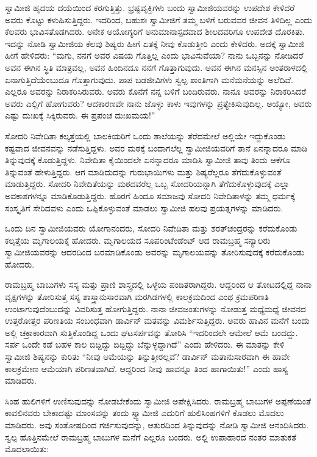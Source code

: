  ಸ್ವಾಮೀಜಿ ಹೃದಯ ದಯೆಯಿಂದ ಕರಗುತ್ತಿತ್ತು. ಭ್ರಷ್ಟವೃಕ್ತಿಗಳು ಬಂದು ಸ್ವಾಮೀಜಿಯವರನ್ನು ಉಪದೇಶ ಕೇಳಿದರೆ ಅವರು ಕೊಟ್ಟು ಕಳುಹಿಸುತ್ತಿದ್ದರು. ಇದರಿಂದ, ಬಹುಶಃ ಸ್ವಾಮೀಜಿಗೆ ತಮ್ಮ ಬಳಿಗೆ ಬರುವವರ ಜೀವನ ತಿಳಿದಿಲ್ಲ ಎಂದು ಕೆಲವರು ಭಾವಿಸತೊಡಗಿದರು. ಅನೇಕ ಅಯೋಗ್ಯರಿಗೆ ಅನುಮಾನಾಸ್ಪದವಾದ ಶೀಲದವರಿಗೂ ಉಪದೇಶ ದೊರಕಿತು. ಇದನ್ನು ನೋಡಿ ಸ್ವಾಮೀಜಿಯ ಕೆಲವು ಶಿಷ್ಯರು ಹೀಗೆ ಏತಕ್ಕೆ ನೀವು ಕೊಡುತ್ತೀರಿ ಎಂದು ಕೇಳಿದರು. ಅದಕ್ಕೆ ಸ್ವಾಮೀಜಿ ಹೀಗೆ ಹೇಳಿದರು: “ಮಗು, ನನಗೆ ಅವರ ವಿಷಯ ಗೊತ್ತಿಲ್ಲ ಎಂದು ಭಾವಿಸುವೆಯಾ? ನಾನು ಒಬ್ಬನನ್ನು ನೋಡಿದರೆ ಅವನ ಈಗಿನ ಸ್ಥಿತಿ ಮಾತ್ರವಲ್ಲ, ಅವನ ಹಿಂದಿನದೂ ನನಗೆ ಗೊತ್ತಾಗುವುದು. ಅವನ ಈಗಿನ ಮನಸ್ಸಿನ ಅಂತರಾಳದಲ್ಲಿ ಏನಾಗುತ್ತಿದೆಯೆಂಬುದೂ ಗೊತ್ತಾಗುವುದು. ಪಾಪ ಬಡಜೀವಿಗಳು ಸ್ವಲ್ಪ ಶಾಂತಿಗಾಗಿ ಮನೆಮನೆಯನ್ನು ಅಲೆದಿವೆ. ಎಲ್ಲರೂ ಅವರನ್ನು ನಿರಾಕರಿಸಿರುವರು. ಅವರು ಕೊನೆಗೆ ನನ್ನ ಬಳಿಗೆ ಬಂದಿರುವರು. ನಾನೂ ಅವರನ್ನು ನಿರಾಕರಿಸಿದರೆ ಅವರು ಎಲ್ಲಿಗೆ ಹೋಗುವರು? ಆದಕಾರಣವೇ ನಾನು ಜೊಳ್ಳು ಕಾಳು ಇವುಗಳನ್ನು ಪ್ರತ್ಯೇಕಿಸುವುದಿಲ್ಲ. ಅಯ್ಯೋ, ಅವರು ಎಷ್ಟು ದುಃಖಕ್ಕೆ ಸಿಕ್ಕಿರುವರು. ಈ ಪ್ರಪಂಚ ದುಃಖಮಯ!” 

 ಸೋದರಿ ನಿವೇದಿತಾ ಕಲ್ಕತ್ತೆಯಲ್ಲಿ ಬಾಲಕಿಯರಿಗೆ ಒಂದು ಶಾಲೆಯನ್ನು ತೆರೆದಮೇಲೆ ಅಲ್ಲಿಯೇ ಇದ್ದುಕೊಂಡು ಕಷ್ಟವಾದ ಜೀವನವನ್ನು ನಡೆಸುತ್ತಿದ್ದಳು. ಅವರ ಮಠಕ್ಕೆ ಬಂದಾಗಲೆಲ್ಲ ಸ್ವಾಮೀಜಿಯವರಿಗೆ ತಾನೆ ಏನನ್ನಾದರೂ ಮಾಡಿ ತಿನ್ನುವುದಕ್ಕೆ ಕೊಡುತ್ತಿದ್ದಳು. ನಿವೇದಿತಾ ಕೈಯಿಂದಲೇ ಏನನ್ನಾದರೂ ಮಾಡಿಸಿ ಸ್ವಾಮೀಜಿ ತಾವು ತಿಂದು ಆಕೆಗೂ ತಿನ್ನುವಂತೆ ಹೇಳುತ್ತಿದ್ದರು. ಆಗ ಮಾಡಿದುದನ್ನು ಗುರುಭಾಯಿಗಳು ಮತ್ತು ಶಿಷ್ಯರೆಲ್ಲರೂ ತೆಗೆದುಕೊಳ್ಳುವಂತೆ ಮಾಡುತ್ತಿದ್ದರು. ಸೋದರಿ ನಿವೇದಿತೆಯನ್ನು ಮಠದವರೆಲ್ಲ ಒಬ್ಬ ಸೋದರಿಯನ್ನಾಗಿ ತೆಗೆದುಕೊಳ್ಳುವುದಕ್ಕೆ ಎಲ್ಲಾ ಅವಕಾಶಗಳನ್ನೂ ಮಾಡಿಕೊಡುತ್ತಿದ್ದರು. ಹೊರಗೆ ಹಿಂದೂ‌ ಸಮಾಜವು ಸೋದರಿ ನಿವೇದಿತಾಳನ್ನು ತಮ್ಮ ಧರ್ಮಕ್ಕೆ ಸಂಸ್ಕೃತಿಗೆ ಸೇರಿದವಳು ಎಂದು ಒಪ್ಪಿಕೊಳ್ಳುವಂತೆ ಮಾಡಲು ಸ್ವಾಮೀಜಿ ಹಲವು ಪ್ರಯತ್ನಗಳನ್ನು ಮಾಡಿದರು. 

 ಒಂದು ದಿನ ಸ್ವಾಮೀಜಿಯವರು ಯೋಗಾನಂದರು, ಸೋದರಿ ನಿವೇದಿತಾ ಮತ್ತು ಶರತ್‍ಚಂದ್ರರನ್ನು ಕರೆದುಕೊಂಡು ಕಲ್ಕತ್ತೆಯ ಮೃಗಾಲಯಕ್ಕೆ ಹೋದರು. ಮೃಗಾಲಯದ ಸೂಪರಿಂಟೆಂಡೆಂಟ್ ಆದ ರಾಮಬ್ರಹ್ಮ ಸನ್ಯಾಲರು ಸ್ವಾಮೀಜಿಯವರನ್ನು ಆದರದಿಂದ ಬರಮಾಡಿಕೊಂಡು ಅವರನ್ನು ಮೃಗಾಲಯವನ್ನು ತೋರಿಸುವುದಕ್ಕೆ ಕರೆದುಕೊಂಡು ಹೋದರು. 

 ರಾಮಬ್ರಹ್ಮ ಬಾಬುಗಳು ಸಸ್ಯ ಮತ್ತು ಪ್ರಾಣಿ ಶಾಸ್ತ್ರದಲ್ಲಿ ಒಳ್ಳೆಯ ಪಂಡಿತರಾಗಿದ್ದರು. ಆದ್ದರಿಂದ ಆ ತೋಟದಲ್ಲಿದ್ದ ನಾನಾ ವೃಕ್ಷಗಳನ್ನು ತೋರಿಸುತ್ತ ಸಸ್ಯ ಶಾಸ್ತ್ರಾನುಸಾರವಾಗಿ ಮರಗಿಡಗಳಲ್ಲಿ ಕಾಲಕ್ರಮದಿಂದ ಎಂಥ ಕ್ರಮಪರಿಣತಿ ಉಂಟಾಗುವುದೆಂಬುದನ್ನು ವಿವರಿಸುತ್ತ ಹೋಗುತ್ತಿದ್ದರು. ನಾನಾ ಜೀವಜಂತುಗಳನ್ನು ನೋಡುತ್ತ ಮಧ್ಯೆಮಧ್ಯೆ ಜೀವನದ ಉತ್ತರೋತ್ತರ ಪರಿಣತಿಯ ಸಂಬಂಧವಾಗಿ ಡಾರ್ವಿನ್ ಮತವನ್ನು ವಿಮರ್ಶಿಸುತ್ತಿದ್ದರು. ಅವರು ಹಾವಿನ ಮನೆಗೆ ಬಂದು ಅಲ್ಲಿ ಚಕ್ರಾಕಾರವಾಗಿ ಸುತ್ತಿಕೊಂಡಿದ್ದ ಒಂದು ಘಟಸರ್ಪವನ್ನು ತೋರಿಸಿ “ಇದರಿಂದಲೇ ಆಮೇಲೆ ಆಮೆ ಬಂದದ್ದು. ಸರ್ಪ ಒಂದೇ ಕಡೆ ಬಹಳ ಕಾಲ ಬಿದ್ದಿದ್ದು ಬಿದ್ದಿದ್ದು ಬೆನ್ನುಳ್ಳದ್ದಾಗಿದೆ” ಎಂದು ಹೇಳಿದರು. ಈ ಮಾತನ್ನು ಕೇಳಿ ಸ್ವಾಮೀಜಿ ಶಿಷ್ಯನನ್ನು ಕುರಿತು “ನೀವು ಆಮೆಯನ್ನು ತಿನ್ನುತ್ತೀರಲ್ಲವೆ? ಡಾರ್ವಿನ್ ಮತಾನುಸಾರವಾಗಿ ಈ ಹಾವೇ ಕಾಲಕ್ರಮೇಣ ಆಮೆಯಾಗಿ ಪರಿಣತವಾಗಿದೆ. ಆದ್ದರಿಂದ ನೀವು ಹಾವನ್ನೂ ತಿಂದ ಹಾಗಾಯಿತು!” ಎಂದು ಹಾಸ್ಯ ಮಾಡಿದರು. 

 ಸಿಂಹ ಹುಲಿಗಳಿಗೆ ಉಣಿಸುವುದನ್ನು ನೋಡಬೇಕೆಂದು ಸ್ವಾಮೀಜಿ ಅಪೇಕ್ಷಿಸಿದರು. ರಾಮಬ್ರಹ್ಮ ಬಾಬುಗಳ ಅಪ್ಪಣೆಯಂತೆ ಕಾವಲಿನವರು ಬೇಕಾದಷ್ಟು ಮಾಂಸವನ್ನು ತಂದು ಸ್ವ್ವಾಮೀಜಿ ಎದುರಿಗೆ ಹುಲಿಸಿಂಹಗಳಿಗೆ ಕೊಡಲು ಮೊದಲು ಮಾಡಿದರು. ಅವು ಸಂತೋಷದಿಂದ ಗರ್ಜಿಸುವುದನ್ನು, ಆತುರದಿಂದ ತಿನ್ನುವುದನ್ನು ನೋಡಿ ಸ್ವಾಮೀಜಿ ಆನಂದಿಸಿದರು. ಸ್ವಲ್ಪ ಹೊತ್ತಿನಮೇಲೆ ರಾಮಬ್ರಹ್ಮ ಬಾಬುಗಳ ಮನೆಗೆ ಎಲ್ಲರೂ ಬಂದರು. ಅಲ್ಲಿ ಉಪಾಹಾರದ ನಂತರ ಮಾತುಕತೆ ಮೊದಲಾಯಿತು: 

